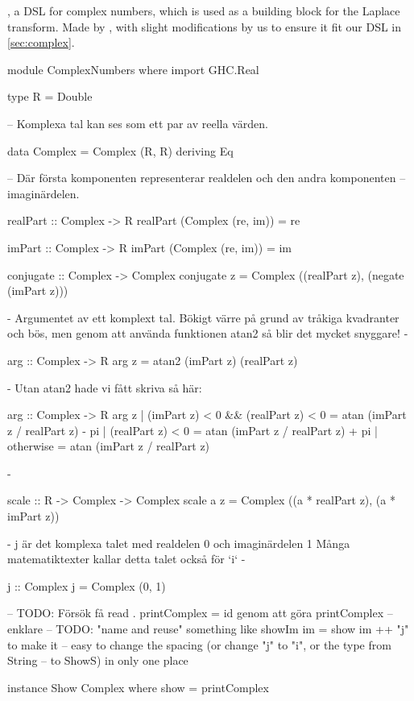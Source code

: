 \begin{codefig}
\caption{, a DSL for complex numbers, which is used as a building block for the Laplace transform. Made by \cite{tssarbete}, with slight modifications by us to ensure it fit our DSL in \ref{sec:complex}.}
\label{code:complex}
\begin{code}
module ComplexNumbers where
import GHC.Real

type R = Double

-- Komplexa tal kan ses som ett par av reella värden.

data Complex = Complex (R, R)
    deriving Eq

-- Där första komponenten representerar realdelen och den andra komponenten
-- imaginärdelen.

realPart :: Complex -> R
realPart (Complex (re, im)) = re

imPart :: Complex -> R
imPart (Complex (re, im)) = im

conjugate :: Complex -> Complex
conjugate z = Complex ((realPart z), (negate (imPart z)))

{-
   Argumentet av ett komplext tal.
   Bökigt värre på grund av tråkiga kvadranter och bös,
   men genom att använda funktionen atan2 så blir det mycket snyggare!
-}

arg :: Complex -> R
arg z = atan2 (imPart z) (realPart z)

{-
   Utan atan2 hade vi fått skriva så här:

   arg :: Complex -> R
   arg z  | (imPart z) < 0  && (realPart z) < 0 = atan (imPart z / realPart z) - pi
          | (realPart z) < 0                    = atan (imPart z / realPart z) + pi
          | otherwise                           = atan (imPart z / realPart z)

-}

scale :: R -> Complex -> Complex
scale a z = Complex ((a * realPart z), (a * imPart z))

{-
   j är det komplexa talet med realdelen 0 och imaginärdelen 1
   Många matematiktexter kallar detta talet också för `i`
-}

j :: Complex
j = Complex (0, 1)

-- TODO: Försök få   read . printComplex = id genom att göra printComplex
-- enklare
-- TODO: "name and reuse" something like showIm im = show im ++ "j" to make it
-- easy to change the spacing (or change "j" to "i", or the type from String
-- to ShowS) in only one place

instance Show Complex where
    show = printComplex


\end{code}
\end{codefig}

